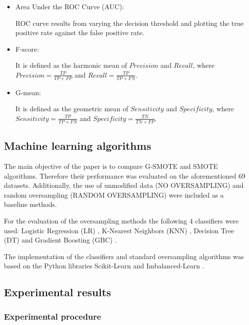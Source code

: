 \documentclass[parskip=full]{scrartcl}
\begin{document}
\begin{itemize}
	
	\renewcommand\labelitemi{--}
	
	\item Area Under the ROC Curve (AUC):
	
	ROC curve results from varying the decision threshold and plotting the true positive rate against the false positive rate.
	
	\item F-score:
	
	It is defined as the harmonic mean of \(Precision\) and \(Recall\), where \(Precision = \frac{TP}{TP + FP}\) and \(Recall = \frac{TP}{TP + FN}\).
	
	\item G-mean:
	
	It is defined as the geometric mean of \(Sensitivity\) and \(Specificity\), where \(Sensitivity = \frac{TP}{TP + FN}\) and \(Specificity = \frac{TN}{TN + FP}\).
	
\end{itemize}

\subsection{Machine learning algorithms}

The main objective of the paper is to compare G-SMOTE and SMOTE algorithms. Therefore their performance was evaluated on the aforementioned 69 datasets. Additionally, the use of unmodified data (NO OVERSAMPLING) and random oversampling (RANDOM OVERSAMPLING) were included as a baseline methods.

For the evaluation of the oversampling methods the following 4 classifiers were used: Logistic Regression (LR) \cite{McCullagh1989}, K-Nearest Neighbors (KNN) \cite{Cover1967}, Decision Tree (DT) \cite{Salzberg1994} and Gradient Boosting (GBC) \cite{Friedman2001}.

The implementation of the classifiers and standard oversampling algorithms was based on the Python libraries Scikit-Learn \cite{Pedregosa2011} and Imbalanced-Learn \cite{Lemaitre2016}.

\subsection{Experimental results}

\subsubsection{Experimental procedure}
\end{document}
